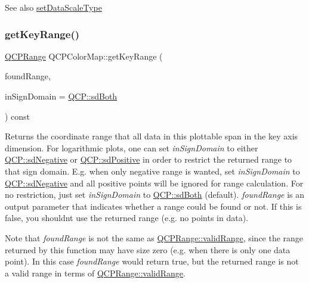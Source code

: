 \begin{DoxySeeAlso}{See also}
\hyperlink{classQCPColorMap_a9d20aa08e3c1f20f22908c45b9c06511}{set\+Data\+Scale\+Type} 
\end{DoxySeeAlso}
\mbox{\label{classQCPColorMap_a985861974560f950af6cb7fae8c46267}} 
\subsubsection{\texorpdfstring{get\+Key\+Range()}{getKeyRange()}}
{\footnotesize\ttfamily \hyperlink{classQCPRange}{Q\+C\+P\+Range} Q\+C\+P\+Color\+Map\+::get\+Key\+Range (\begin{DoxyParamCaption}\item[{bool \&}]{found\+Range,  }\item[{\hyperlink{namespaceQCP_afd50e7cf431af385614987d8553ff8a9}{Q\+C\+P\+::\+Sign\+Domain}}]{in\+Sign\+Domain = {\ttfamily \hyperlink{namespaceQCP_afd50e7cf431af385614987d8553ff8a9aa38352ef02d51ddfa4399d9551566e24}{Q\+C\+P\+::sd\+Both}} }\end{DoxyParamCaption}) const\hspace{0.3cm}{\ttfamily [virtual]}}

Returns the coordinate range that all data in this plottable span in the key axis dimension. For logarithmic plots, one can set {\itshape in\+Sign\+Domain} to either \hyperlink{namespaceQCP_afd50e7cf431af385614987d8553ff8a9a2d18af0bc58f6528d1e82ce699fe4829}{Q\+C\+P\+::sd\+Negative} or \hyperlink{namespaceQCP_afd50e7cf431af385614987d8553ff8a9a584784b75fb816abcc627cf743bb699f}{Q\+C\+P\+::sd\+Positive} in order to restrict the returned range to that sign domain. E.\+g. when only negative range is wanted, set {\itshape in\+Sign\+Domain} to \hyperlink{namespaceQCP_afd50e7cf431af385614987d8553ff8a9a2d18af0bc58f6528d1e82ce699fe4829}{Q\+C\+P\+::sd\+Negative} and all positive points will be ignored for range calculation. For no restriction, just set {\itshape in\+Sign\+Domain} to \hyperlink{namespaceQCP_afd50e7cf431af385614987d8553ff8a9aa38352ef02d51ddfa4399d9551566e24}{Q\+C\+P\+::sd\+Both} (default). {\itshape found\+Range} is an output parameter that indicates whether a range could be found or not. If this is false, you shouldn\textquotesingle{}t use the returned range (e.\+g. no points in data).

Note that {\itshape found\+Range} is not the same as \hyperlink{classQCPRange_ab38bd4841c77c7bb86c9eea0f142dcc0}{Q\+C\+P\+Range\+::valid\+Range}, since the range returned by this function may have size zero (e.\+g. when there is only one data point). In this case {\itshape found\+Range} would return true, but the returned range is not a valid range in terms of \hyperlink{classQCPRange_ab38bd4841c77c7bb86c9eea0f142dcc0}{Q\+C\+P\+Range\+::valid\+Range}.

